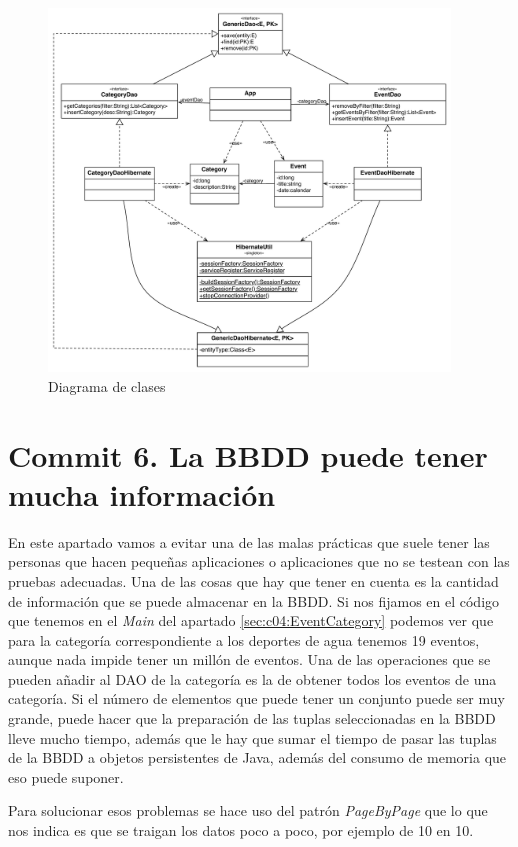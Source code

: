 \documentclass{article}
\begin{document}
\begin{figure}[h]
  \centering
    \includegraphics[width=0.95\textwidth]{commit05/img/UmlClass.pdf}
  \caption{Diagrama de clases}
  \label{fig:c05:UmlClass}
\end{figure}	

\section{Commit 6. La BBDD puede tener mucha información}
	En este apartado vamos a evitar una de las malas prácticas que suele tener las personas que hacen pequeñas aplicaciones o aplicaciones que no se testean con las pruebas adecuadas. Una de las cosas que hay que tener en cuenta es la cantidad de información que se puede almacenar en la BBDD.  Si nos fijamos en el código que tenemos en el \emph{Main} del apartado \ref{sec:c04:EventCategory} podemos ver que para la categoría correspondiente a los deportes de agua tenemos 19 eventos, aunque nada impide tener un millón de eventos. Una de las operaciones que se pueden añadir al DAO de la categoría es la de obtener todos los eventos de una categoría. Si el número de elementos que puede tener un conjunto puede ser muy grande, puede hacer que la preparación de las tuplas seleccionadas en la BBDD lleve mucho tiempo, además que le hay que sumar el tiempo de pasar las tuplas de la BBDD a objetos persistentes de Java, además del consumo de memoria que eso puede suponer.
	
	Para solucionar esos problemas se hace uso del patrón \emph{PageByPage} que lo que nos indica es que se traigan los datos poco a poco, por ejemplo de 10 en 10.
\end{document}
